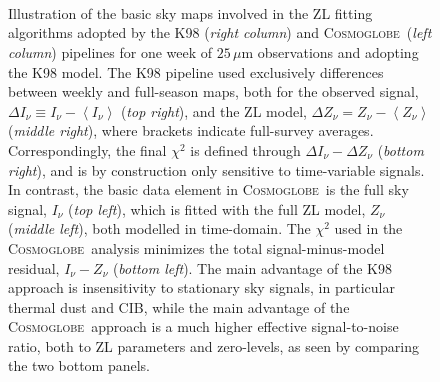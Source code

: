 \documentclass[twocolumn]{aa}
\def\Cosmoglobe{\textsc{Cosmoglobe}}
\begin{document}
\begin{figure}
    \centering
    \\
    \\
    \\
    \caption{Illustration of the basic sky maps involved in the ZL 
    fitting algorithms adopted by the K98 (\emph{right column}) 
    and \Cosmoglobe\ (\emph{left column}) pipelines for one week of 
    $25\,\mu\mathrm{m}$ observations and adopting the K98 model. The 
    K98 pipeline used exclusively differences between weekly and 
    full-season maps, both for the observed signal, 
    $\Delta I_{\nu} \equiv I_{\nu}-\left<I_{\nu}\right>$ (\emph{top right}), 
    and the ZL model, 
    $\Delta Z_{\nu} = Z_{\nu}-\left<Z_{\nu}\right>$ (\emph{middle right}), 
    where brackets indicate full-survey averages. Correspondingly, the 
    final $\chi^2$ is defined through $\Delta I_{\nu} - \Delta Z_{\nu}$ 
    (\emph{bottom right}), and is by construction only sensitive to 
    time-variable signals. In contrast, the basic data element in 
    \Cosmoglobe\ is the full sky signal, $I_{\nu}$ (\emph{top left}), 
    which is fitted with the full ZL model, $Z_{\nu}$ 
    (\emph{middle left}), both modelled in time-domain. The $\chi^2$ 
    used in the \Cosmoglobe\ analysis minimizes the total signal-minus-model residual, 
    $I_{\nu}-Z_{\nu}$ (\emph{bottom left}). The main advantage of the 
    K98 approach is insensitivity to stationary sky signals, in 
    particular thermal dust and CIB, while the main advantage of the 
    \Cosmoglobe\ approach is a much higher effective signal-to-noise 
    ratio, both to ZL parameters and zero-levels, as seen by comparing
    the two bottom panels.}
    \label{fig:week_vs_full}
\end{figure}
\end{document}
